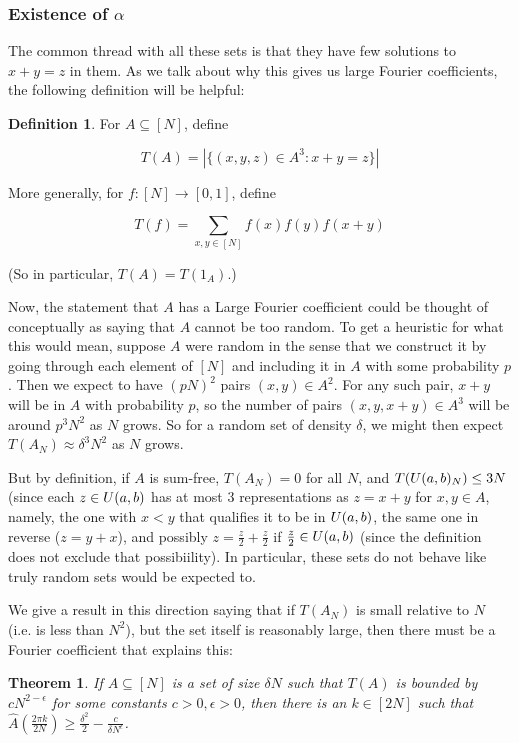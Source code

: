 \documentclass{article}
\newtheorem{theorem}{Theorem}[section]
\theoremstyle{definition}
\newtheorem{definition}{Definition}
\theoremstyle{remark}
\numberwithin{equation}{section}
\begin{document}
\subsubsection{Existence of $\alpha$}

The common thread with all these \relevant sets is that they have few
solutions to $x+y=z$ in them.  As we talk about why this gives us
large Fourier coefficients, the following definition will be helpful:

\begin{definition}
  For $A \subseteq [N]$, define
  
  \[T(A) = \left|\{(x,y,z) \in A^3 : x+y=z\}\right|\]

  More generally, for $f : [N] \to [0,1]$, define

  \[T(f) = \sum_{x,y \in [N]} f(x)f(y)f(x+y)\]

  (So in particular, $T(A) = T(1_A)$.)
\end{definition}

Now, the statement that $A$ has a Large Fourier coefficient could be
thought of conceptually as saying that $A$ cannot be too random.  To
get a heuristic for what this would mean, suppose $A$ were random in
the sense that we construct it by going through each element of $[N]$
and including it in $A$ with some probability $p$.  Then we expect to
have $(pN)^2$ pairs $(x, y) \in A^2$.  For any such pair, $x+y$ will
be in $A$ with probability $p$, so the number of pairs
$(x, y, x+y) \in A^3$ will be around $p^3 N^2$ as $N$ grows.  So for a
random set of density $\delta$, we might then expect
$T(A_N) \approx \delta^3 N^2$ as $N$ grows.  

But by definition, if $A$ is sum-free, $T(A_N) = 0$ for all $N$, and
$T(U(a,b)_N) \leq 3N$ (since each $z \in U(a,b)$ has at most 3
representations as $z = x+y$ for $x,y \in A$, namely, the one with
$x < y$ that qualifies it to be in $U(a,b)$, the same one in
reverse ($z = y+x$), and possibly $z = \frac{z}{2} + \frac{z}{2}$ if
$\frac{z}{2} \in U(a,b)$ (since the definition does not exclude
that possibiility).  In particular, these sets do not behave like
truly random sets would be expected to.  

We give a result in this direction saying that if $T(A_N)$ is small
relative to $N$ (i.e. is less than $N^2$), but the set itself is
reasonably large, then there must be a Fourier coefficient that
explains this: 

\begin{theorem}\label{thm:alpha_finitary}
  If $A \subseteq [N]$ is a set of size $\delta N$ such that $T(A)$ is
  bounded by $c N^{2-\epsilon}$ for some constants
  $c > 0, \epsilon > 0$, then there is an $k \in [2N]$ such that
  $\widehat{A}(\frac{2\pi k}{2N}) \geq \frac{\delta^2}{2} - \frac{c}{\delta
    N^\epsilon}$.
\end{theorem}
\end{document}
